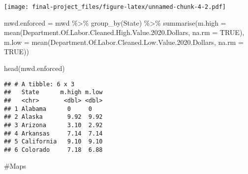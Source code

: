 \documentclass[
]{article}
\newenvironment{Shaded}{\begin{snugshade}}{\end{snugshade}}
\newcommand{\AttributeTok}[1]{\textcolor[rgb]{0.77,0.63,0.00}{#1}}
\newcommand{\ConstantTok}[1]{\textcolor[rgb]{0.00,0.00,0.00}{#1}}
\newcommand{\FloatTok}[1]{\textcolor[rgb]{0.00,0.00,0.81}{#1}}
\newcommand{\FunctionTok}[1]{\textcolor[rgb]{0.00,0.00,0.00}{#1}}
\newcommand{\NormalTok}[1]{#1}
\newcommand{\OtherTok}[1]{\textcolor[rgb]{0.56,0.35,0.01}{#1}}
\newcommand{\SpecialCharTok}[1]{\textcolor[rgb]{0.00,0.00,0.00}{#1}}
\begin{document}
\texttt{[image: final-project\_files/figure-latex/unnamed-chunk-4-2.pdf]}

\begin{Shaded}
\begin{Highlighting}[]
\NormalTok{mwd.enforced }\OtherTok{=}\NormalTok{ mwd }\SpecialCharTok{\%\textgreater{}\%} \FunctionTok{group\_by}\NormalTok{(State) }\SpecialCharTok{\%\textgreater{}\%} 
  \FunctionTok{summarise}\NormalTok{(}\AttributeTok{m.high =} \FunctionTok{mean}\NormalTok{(Department.Of.Labor.Cleaned.High.Value.}\FloatTok{2020.}\NormalTok{Dollars, }\AttributeTok{na.rm =} \ConstantTok{TRUE}\NormalTok{), }
            \AttributeTok{m.low =} \FunctionTok{mean}\NormalTok{(Department.Of.Labor.Cleaned.Low.Value.}\FloatTok{2020.}\NormalTok{Dollars, }\AttributeTok{na.rm =} \ConstantTok{TRUE}\NormalTok{))}

\FunctionTok{head}\NormalTok{(mwd.enforced)}
\end{Highlighting}
\end{Shaded}

\begin{verbatim}
## # A tibble: 6 x 3
##   State      m.high m.low
##   <chr>       <dbl> <dbl>
## 1 Alabama      0     0   
## 2 Alaska       9.92  9.92
## 3 Arizona      3.10  2.92
## 4 Arkansas     7.14  7.14
## 5 California   9.10  9.10
## 6 Colorado     7.18  6.88
\end{verbatim}

\#Maps
\end{document}
